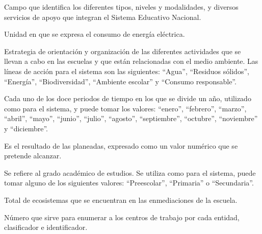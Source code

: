 \begin{description}
    
     Campo que identifica los diferentes tipos, niveles y modalidades, y diversos servicios de apoyo que integran el Sistema Educativo Nacional. %
    
     Unidad en que se expresa el consumo de energía eléctrica.

     Estrategia de orientación y organización de las diferentes actividades que se llevan a cabo en las escuelas y que están 
    relacionadas con el medio ambiente. Las líneas de acción para el sistema son las siguientes: ``Agua'', ``Residuos sólidos'', 
    ``Energía'', ``Biodiversidad'', ``Ambiente escolar'' y ``Consumo responsable''.

     Cada uno de los doce periodos de tiempo en los que se divide un año,  utilizado como  para el sistema, y puede tomar los valores: ``enero'', ``febrero'', ``marzo'', ``abril'', ``mayo'', ``junio'', ``julio'', ``agosto'', ``septiembre'', ``octubre'', ``noviembre'' y ``diciembre''.

     Es el resultado de las  planeadas, expresado como un valor numérico que se pretende alcanzar.
    
     Se refiere al grado académico de estudios. Se utiliza como  para el sistema, puede tomar alguno de los siguientes valores:
    ``Preescolar'', ``Primaria'' o ``Secundaria''.
    
     Total de ecosistemas que se encuentran en las enmediaciones de la escuela.
    
     Número que sirve para enumerar a los centros de trabajo por cada entidad, clasificador e identificador. %
    

\end{description}

